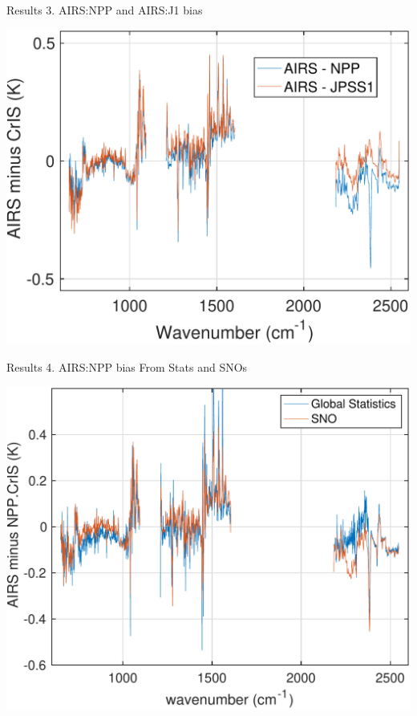 \documentclass[10pt,t]{beamer}
\begin{document}
\begin{frame}{Results 3. AIRS:NPP and AIRS:J1 bias}

\vspace{-0.1in}
  \begin{center}
    \includegraphics[width=0.7\linewidth]{./Figs/2018d060_2019d059_ac1_ac2_sno_mean_bias_v2.pdf}
  \end{center}
    
\end{frame}

\begin{frame}{Results 4. AIRS:NPP bias From Stats and SNOs}

  \begin{center}
    \includegraphics[width=0.65\linewidth]{./Figs/2018d060_2019d059_airs_npp_ac1_bias_stats_sno_v2.pdf}
  \end{center}
    
\end{frame}
\end{document}
